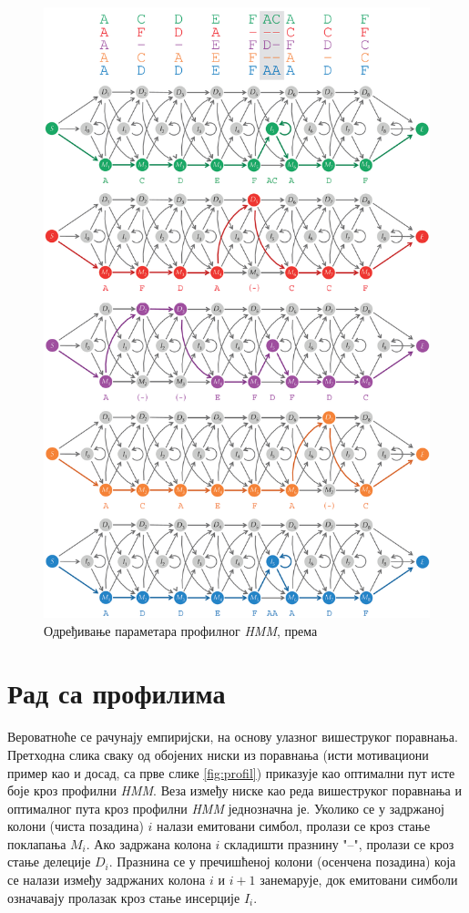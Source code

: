 \documentclass[12pt,oneside]{memoir}
\begin{document}
\begin{CJK}{UTF8}{ipxm}
\begin{figure}[H]
  \centering
  \includegraphics[height=.97\textheight]{prof_param.png}
  \caption{Одређивање параметара профилног \textit{HMM}, према \cite{compeau2015}}
  \label{fig:prof_param}
\end{figure}

\section{Рад са профилима}
Вероватноће се рачунају емпиријски, на основу улазног вишеструког поравнања. Претходна слика сваку од обојених ниски из поравнања (исти мотивациони пример као и досад, са прве слике \ref{fig:profil}) приказује као оптимални пут исте боје кроз профилни \textit{HMM}. Веза између ниске као реда вишеструког поравнања и оптималног пута кроз профилни \textit{HMM} једнозначна је. Уколико се у задржаној колони (чиста позадина) $i$ налази емитовани симбол, пролази се кроз стање поклапања $M_i$. Ако задржана колона $i$ складишти празнину "--", пролази се кроз стање делеције $D_i$. Празнина се у пречишћеној колони (осенчена позадина) која се налази између задржаних колона $i$ и $i+1$ занемарује, док емитовани симболи означавају пролазак кроз стање инсерције $I_i$.


\end{CJK}
\end{document}
